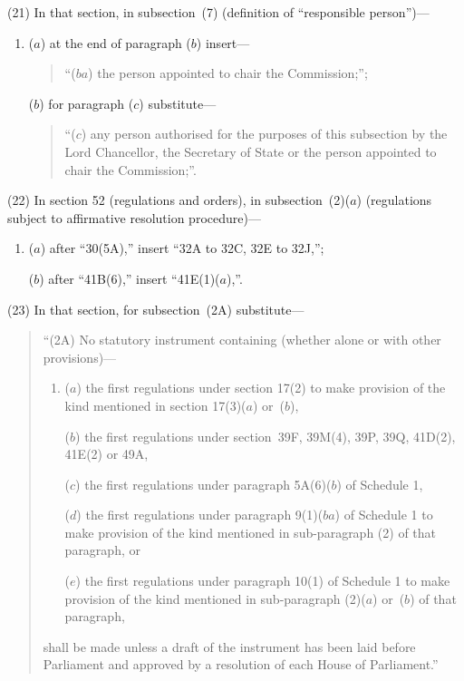 \documentclass[12pt,a4paper]{article}
\begin{document}
(21) In that section, in subsection~(7) (definition of “responsible person”)—
\begin{enumerate}\item[]
($a$) at the end of paragraph ($b$) insert—
\begin{quotation}
“($ba$) the person appointed to chair the Commission;”;
\end{quotation}

($b$) for paragraph ($c$) substitute—
\begin{quotation}
“($c$) any person authorised for the purposes of this subsection by the Lord Chancellor, the Secretary of State or the person appointed to chair the Commission;”.
\end{quotation}
\end{enumerate}

(22) In section 52 (regulations and orders), in subsection~(2)($a$) (regulations subject to affirmative resolution procedure)—
\begin{enumerate}\item[]
($a$) after “30(5A),” insert  “32A to 32C, 32E to 32J,”;

($b$) after “41B(6),” insert  “41E(1)($a$),”.
\end{enumerate}

(23) In that section, for subsection~(2A) substitute—
\begin{quotation}
“(2A) No statutory instrument containing (whether alone or with other provisions)—
\begin{enumerate}\item[]
($a$) the first regulations under section 17(2) to make provision of the kind mentioned in section 17(3)($a$) or~($b$),

($b$) the first regulations under section~39F, 39M(4), 39P, 39Q, 41D(2), 41E(2) or 49A,

($c$) the first regulations under paragraph 5A(6)($b$) of Schedule 1,

($d$) the first regulations under paragraph 9(1)($ba$) of Schedule 1 to make provision of the kind mentioned in sub-paragraph (2) of that paragraph, or

($e$) the first regulations under paragraph 10(1) of Schedule 1 to make provision of the kind mentioned in sub-paragraph (2)($a$) or~($b$) of that paragraph,
\end{enumerate}
shall be made unless a draft of the instrument has been laid before Parliament and approved by a resolution of each House of Parliament.”
\end{quotation}
\end{document}
